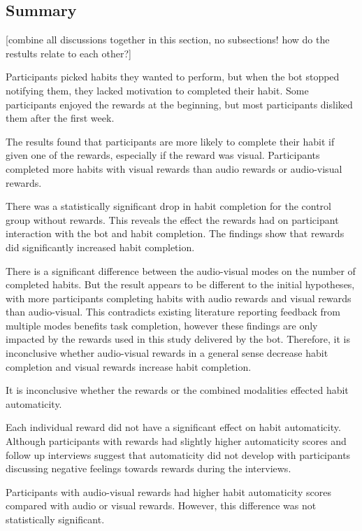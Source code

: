 \documentclass{scaffold/sigchi}
\begin{document}
\subsection{Summary}
[combine all discussions together in this section, no subsections! how do the restults relate to each other?]

Participants picked habits they wanted to perform, but when the bot stopped notifying them, they lacked motivation to completed their habit. Some participants enjoyed the rewards at the beginning, but most participants disliked them after the first week.

The results found that participants are more likely to complete their habit if given one of the rewards, especially if the reward was visual. Participants completed more habits with visual rewards than audio rewards or audio-visual rewards.

There was a statistically significant drop in habit completion for the control group without rewards. This reveals the effect the rewards had on participant interaction with the bot and habit completion. The findings show that rewards did significantly increased habit completion.

There is a significant difference between the audio-visual modes on the number of completed habits. But the result appears to be different to the initial hypotheses, with more participants completing habits with audio rewards and visual rewards than audio-visual. This contradicts existing literature reporting feedback from multiple modes benefits task completion, however these findings are only impacted by the rewards used in this study delivered by the bot. Therefore, it is inconclusive whether audio-visual rewards in a general sense decrease habit completion and visual rewards increase habit completion.

It is inconclusive whether the rewards or the combined modalities effected habit automaticity. 

Each individual reward did not have a significant effect on habit automaticity. Although participants with rewards had slightly higher automaticity scores and follow up interviews suggest that automaticity did not develop with participants discussing negative feelings towards rewards during the interviews.  

Participants with audio-visual rewards had higher habit automaticity scores compared with audio or visual rewards. However, this difference was not statistically significant.
\end{document}
